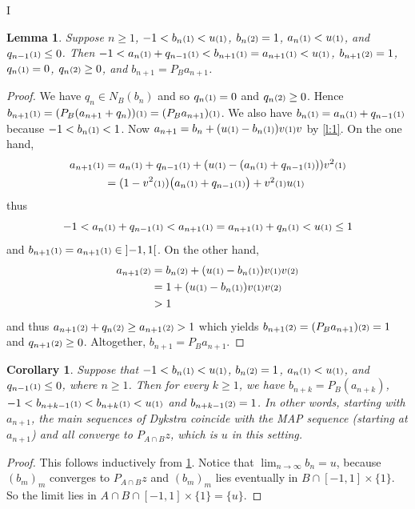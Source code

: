 I\documentclass[12pt]{article}
\newtheorem{lemma}[theorem]{Lemma}
\newtheorem{corollary}[theorem]{Corollary}
\newcommand{\eins}{\ensuremath{\textstyle\mathsmaller{({1})}}}
\newcommand{\zwei}{\ensuremath{\textstyle\mathsmaller{({2})}}}
\begin{document}
\begin{lemma}
\label{l:5+}
Suppose $n\geq 1$,
$-1<b_n\eins<u\eins$, 
$b_n\zwei=1$, 
$a_n\eins<u\eins$,
and 
$q_{n-1}\eins\leq 0$.
Then
$-1<a_{n}\eins+q_{n-1}\eins < b_{n+1}\eins = a_{n+1}\eins<u\eins$,
$b_{n+1}\zwei = 1$, 
$q_n\eins=0$, 
$q_n\zwei\geq 0$,
and 
$b_{n+1}=P_Ba_{n+1}$. 
\end{lemma}
\begin{proof}
We have $q_n\in N_B(b_n)$ and so 
$q_n\eins = 0$ and $q_n\zwei\geq 0$. 
Hence 
$b_{n+1}\eins = (P_B(a_{n+1}+q_{n}))\eins = (P_Ba_{n+1})\eins$. 
We also have
$b_n\eins = a_n\eins+q_{n-1}\eins$ 
because $-1<b_n\eins<1$. 
Now $a_{n+1} = 
b_n + (u\eins-b_n\eins)v\eins v$ 
by \cref{l:1}.
On the one hand,
\begin{subequations}
\begin{align}
a_{n+1}\eins 
&= a_n\eins+q_{n-1}\eins + 
(u\eins-(a_n\eins+q_{n-1}\eins))v^2\eins \\
&=
(1-v^2\eins)\big(a_n\eins+q_{n-1}\eins\big)
+v^2\eins u\eins
\end{align}
\end{subequations}
thus 
\begin{equation}
-1<a_{n}\eins+q_{n-1}\eins < a_{n+1}\eins
=a_{n+1}\eins+q_n\eins < u\eins \leq 1
\end{equation}
and 
$b_{n+1}\eins = a_{n+1}\eins \in \left]-1,1\right[$. 
On the other hand,
\begin{subequations}
\begin{align}
a_{n+1}\zwei
&= b_n\zwei+(u\eins-b_n\eins)v\eins v\zwei\\
&= 1+(u\eins-b_n\eins)v\eins v\zwei\\
&> 1
\end{align}
\end{subequations}
and thus $a_{n+1}\zwei+q_n\zwei \geq a_{n+1}\zwei>1$
which yields $b_{n+1}\zwei  = (P_Ba_{n+1})\zwei = 1$ 
and $q_{n+1}\zwei\geq 0$.
Altogether, $b_{n+1} = P_Ba_{n+1}$.
\end{proof}

\begin{corollary}
\label{c:7}
Suppose that 
$-1<b_n\eins<u\eins$, 
$b_n\zwei=1$, 
$a_n\eins<u\eins$, 
and 
$q_{n-1}\eins\leq 0$, where $n\geq 1$. 
Then for every $k\geq 1$, we have
$b_{n+k} = P_B(a_{n+k})$,
$-1<b_{n+k-1}\eins < b_{n+k}\eins < u\eins$ and 
$b_{n+k-1}\zwei=1$.
In other words, starting with $a_{n+1}$,
the main sequences of Dykstra coincide with 
the MAP sequence 
(starting at $a_{n+1}$) and all converge to 
$P_{A\cap B}z$, which is $u$ in this setting. 
\end{corollary}
\begin{proof}
This follows inductively from \cref{l:5+}. 
Notice that $\lim_{n\to\infty} b_n=u$,
because $(b_m)_m$ converges to $P_{A\cap B}z$ and 
$(b_m)_m$ lies eventually in $B\cap [-1,1]\times\{1\}$. 
So the limit lies in $A\cap B \cap [-1,1] \times\{1\} = \{u\}$.
\end{proof}
\end{document}
